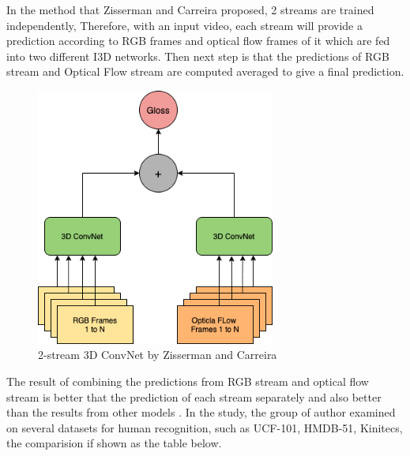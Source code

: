\documentclass[a4paper, 12pt]{article}
\begin{document}
In the method that Zisserman and Carreira proposed, 2 streams are trained independently, Therefore, with an input video, each stream will provide a prediction according to RGB frames and optical flow frames of it which are fed into two different I3D networks. Then next step is that the predictions of RGB stream and Optical Flow stream are computed averaged to give a final prediction.

\begin{figure}[H]
    \centering
    \includegraphics[width=0.7\textwidth]{2-stream I3D Model.png}
    \caption{2-stream 3D ConvNet by Zisserman and Carreira \citep{carreira2017quo}}
    \label{Figure 2-Stream 3D ConvNet}
\end{figure}

 The result of combining the predictions from RGB stream and optical flow stream is better that the prediction of each stream separately and also better than the results from other models \citep{carreira2017quo}. In the study, the group of author examined on several datasets for human recognition, such as UCF-101, HMDB-51, Kinitecs, the comparision if shown as the table below.
\end{document}
